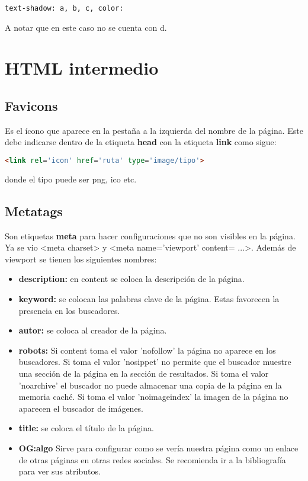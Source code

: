 \documentclass[10pt,oneside]{article}
\begin{document}
\begin{multicols}{2}
    \begin{lstlisting}
text-shadow: a, b, c, color:        
    \end{lstlisting}  

    A notar que en este caso no se cuenta con d. 

\section{HTML intermedio}

\subsection{Favicons} 
    
    Es el ícono que aparece en la pestaña a la izquierda del nombre de la página. Este debe indicarse dentro de la etiqueta \textbf{head} con la etiqueta \textbf{link} como sigue:

    \begin{lstlisting}[language=HTML]
<link rel='icon' href='ruta' type='image/tipo'>
    \end{lstlisting}

    donde el tipo puede ser png, ico etc.

\subsection{Metatags}

    Son etiquetas \textbf{meta} para hacer configuraciones que no son visibles en la página. Ya se vio  <meta charset> y <meta name='viewport' content= ...>. Además de viewport se tienen los siguientes nombres:

    \begin{itemize}
        \item \textbf{description:} en content se coloca la descripción de la página. 
        \item \textbf{keyword:} se colocan las palabras clave de la página. Estas favorecen la presencia en los buscadores.
        \item \textbf{autor:} se coloca al creador de la página.
        \item \textbf{robots:} Si content toma el valor 'nofollow' la página no aparece en los buscadores. Si toma el valor 'nosippet' no permite que el buscador muestre una sección de la página en la sección de resultados. Si toma el valor 'noarchive' el buscador no puede almacenar una copia de la página en la memoria caché. Si toma el valor 'noimageindex' la imagen de la página no aparecen el buscador de imágenes. 
        \item \textbf{title:} se coloca el título de la página.
        \item \textbf{OG:algo} Sirve para configurar como se vería nuestra página como un enlace de otras páginas en otras redes sociales. Se recomienda ir a la bibliografía para ver sus atributos.      
    \end{itemize}


\end{multicols}
\end{document}
